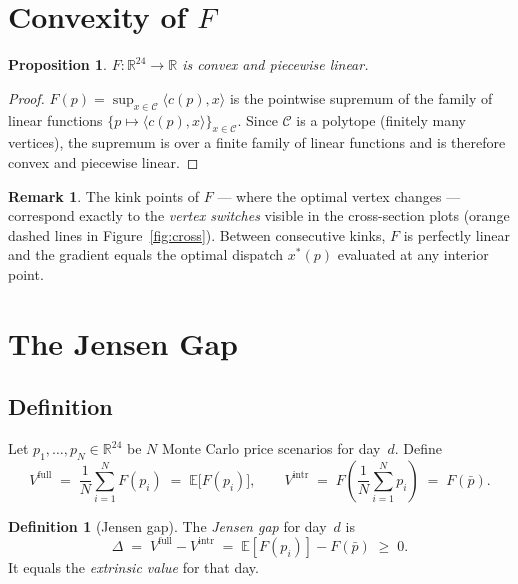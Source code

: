 \documentclass[11pt, a4paper]{article}
\theoremstyle{plain}
\newtheorem{proposition}[theorem]{Proposition}
\theoremstyle{definition}
\newtheorem{definition}[theorem]{Definition}
\newtheorem{remark}[theorem]{Remark}
\newcommand{\E}{\mathbb{E}}
\newcommand{\R}{\mathbb{R}}
\newcommand{\C}{\mathcal{C}}
\newcommand{\pbar}{\bar{p}}
\newcommand{\xstar}{x^*}
\begin{document}
\section{Convexity of \texorpdfstring{$F$}{F}}

\begin{proposition}
$F : \R^{24} \to \R$ is \emph{convex} and \emph{piecewise linear}.
\end{proposition}
\begin{proof}
$F(p) = \sup_{x \in \C} \langle c(p), x \rangle$ is the pointwise
supremum of the family of linear functions $\{p \mapsto \langle c(p), x \rangle\}_{x \in \C}$.
Since $\C$ is a polytope (finitely many vertices), the supremum is over
a finite family of linear functions and is therefore convex and piecewise linear.
\end{proof}

\begin{remark}
The kink points of $F$ — where the optimal vertex changes — correspond
exactly to the \emph{vertex switches} visible in the cross-section plots
(orange dashed lines in Figure~\ref{fig:cross}).
Between consecutive kinks, $F$ is perfectly linear and the gradient equals
the optimal dispatch $\xstar(p)$ evaluated at any interior point.
\end{remark}

\section{The Jensen Gap}

\subsection{Definition}

Let $p_1, \ldots, p_N \in \R^{24}$ be $N$ Monte Carlo price scenarios for
day~$d$.  Define
\begin{equation}
  V^{\mathrm{full}}
  \;=\;
  \frac{1}{N} \sum_{i=1}^N F(p_i)
  \;=\;
  \E\bigl[F(p_i)\bigr],
  \qquad
  V^{\mathrm{intr}}
  \;=\;
  F\!\left(\frac{1}{N}\sum_{i=1}^N p_i\right)
  \;=\;
  F(\pbar).
\end{equation}

\begin{definition}[Jensen gap]
The \emph{Jensen gap} for day~$d$ is
\begin{equation}
  \Delta
  \;=\;
  V^{\mathrm{full}} - V^{\mathrm{intr}}
  \;=\;
  \E[F(p_i)] - F(\pbar)
  \;\geq\; 0.
  \label{eq:gap}
\end{equation}
It equals the \emph{extrinsic value} for that day.
\end{definition}
\end{document}
